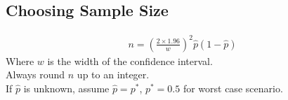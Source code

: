 \documentclass[10pt, a4paper, titlepage]{article}
\begin{document}
\begin{multicols*}{3}
\dotfill
\subsection{Choosing Sample Size}
\begin{align}
	n=\left(\frac{2\times 1.96}{w}\right)^2\hat{p}(1-\hat{p})
\end{align}
Where $w$ is the width of the confidence interval.\\
Always round $n$ up to an integer.\\
If $\hat{p}$ is unknown, assume $\hat{p}=p^*$, $p^*=0.5$ for worst case scenario.\\

\hrulefill
\end{multicols*}
\end{document}

